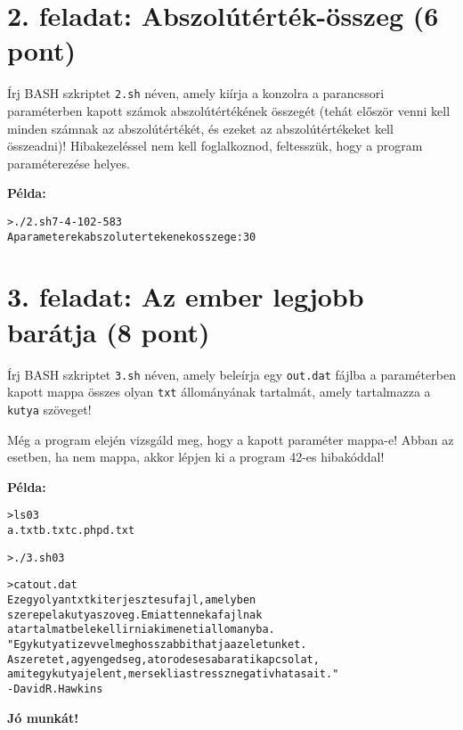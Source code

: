 \documentclass[a4paper,12pt]{article}
\begin{document}
\section*{2. feladat: Abszolútérték-összeg (6 pont)}
Írj BASH szkriptet \texttt{2.sh} néven, amely kiírja a konzolra a parancssori paraméterben kapott számok abszolútértékének összegét (tehát először venni kell minden számnak az abszolútértékét, és ezeket az abszolútértékeket kell összeadni)! Hibakezeléssel nem kell foglalkoznod, feltesszük, hogy a program paraméterezése helyes.

\textbf{Példa:}

\begin{alltt}
> ./2.sh 7 -4 -1 0 2 -5 8 3
A parameterek abszolutertekenek osszege: 30
\end{alltt}

\section*{3. feladat: Az ember legjobb barátja (8 pont)}
Írj BASH szkriptet \texttt{3.sh} néven, amely beleírja egy \texttt{out.dat} fájlba a paraméterben kapott mappa összes olyan \texttt{txt} állományának tartalmát, amely tartalmazza a \texttt{kutya} szöveget!

Még a program elején vizsgáld meg, hogy a kapott paraméter mappa-e! Abban az esetben, ha nem mappa, akkor lépjen ki a program 42-es hibakóddal!

\textbf{Példa:}

\begin{alltt}
> ls 03
a.txt   b.txt   c.php   d.txt

> ./3.sh 03

> cat out.dat
Ez egy olyan txt kiterjesztesu fajl, amelyben 
szerepel a kutya szoveg. Emiatt ennek a fajlnak 
a tartalmat bele kell irni a kimeneti allomanyba.
"Egy kutya tiz evvel meghosszabbithatja az eletunket. 
A szeretet, a gyengedseg, a torodes es a barati kapcsolat, 
amit egy kutya jelent, mersekli a stressz negativ hatasait."
- David R. Hawkins
\end{alltt}

\textbf{Jó munkát!}
\end{document}
